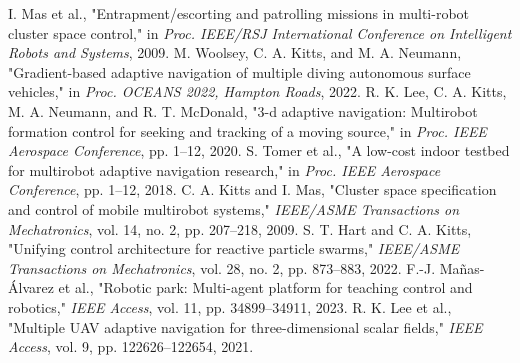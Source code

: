  I. Mas et al., "Entrapment/escorting and patrolling missions in multi-robot cluster space control," in \textit{Proc. IEEE/RSJ International Conference on Intelligent Robots and Systems}, 2009.
 M. Woolsey, C. A. Kitts, and M. A. Neumann, "Gradient-based adaptive navigation of multiple diving autonomous surface vehicles," in \textit{Proc. OCEANS 2022, Hampton Roads}, 2022.
 R. K. Lee, C. A. Kitts, M. A. Neumann, and R. T. McDonald, "3-d adaptive navigation: Multirobot formation control for seeking and tracking of a moving source," in \textit{Proc. IEEE Aerospace Conference}, pp. 1--12, 2020.
 S. Tomer et al., "A low-cost indoor testbed for multirobot adaptive navigation research," in \textit{Proc. IEEE Aerospace Conference}, pp. 1--12, 2018.
 C. A. Kitts and I. Mas, "Cluster space specification and control of mobile multirobot systems," \textit{IEEE/ASME Transactions on Mechatronics}, vol. 14, no. 2, pp. 207--218, 2009.
 S. T. Hart and C. A. Kitts, "Unifying control architecture for reactive particle swarms," \textit{IEEE/ASME Transactions on Mechatronics}, vol. 28, no. 2, pp. 873--883, 2022.
 F.-J. Mañas-Álvarez et al., "Robotic park: Multi-agent platform for teaching control and robotics," \textit{IEEE Access}, vol. 11, pp. 34899--34911, 2023.
 R. K. Lee et al., "Multiple UAV adaptive navigation for three-dimensional scalar fields," \textit{IEEE Access}, vol. 9, pp. 122626--122654, 2021.
